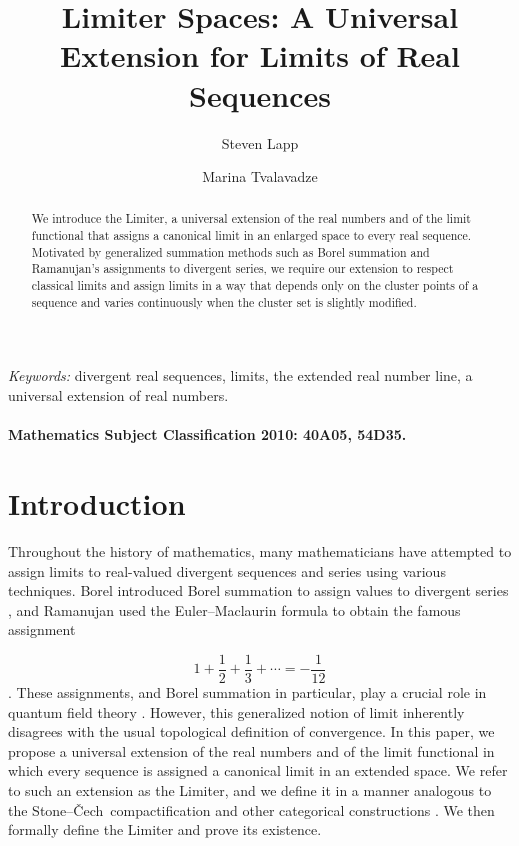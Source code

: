 \documentclass{amsart}
\theoremstyle{definition}
\theoremstyle{plain}
\begin{document}
\title{Limiter Spaces: A Universal Extension for Limits of Real Sequences}
\author{Steven Lapp}
\address{S. Lapp, Department Of Mathematical and
Computational Sciences, University of Toronto Mississauga, 3359
Mississauga Road N., Mississauga, On L5L 1C6}

\author{Marina  Tvalavadze}

\address{M. Tvalavadze, Department Of Mathematical and
Computational Sciences, University of Toronto Mississauga, 3359
Mississauga Road N., Mississauga, On L5L 1C6}

\begin{abstract}
We introduce the Limiter, a universal extension of the real numbers and of the limit functional that assigns a canonical limit in an enlarged space to every real sequence. Motivated by generalized summation methods such as Borel summation and Ramanujan’s assignments to divergent series, we require our extension to respect classical limits and assign limits in a way that depends only on the cluster points of a sequence and varies continuously when the cluster set is slightly modified.    
\end{abstract}
\maketitle
\textit{ Keywords:} divergent real sequences, limits, the extended real number line, a universal extension of real numbers. \\ \ \\
{\small \bf Mathematics Subject Classification 2010: 40A05, 54D35.}



 \section{Introduction}
Throughout the history of mathematics, many mathematicians have attempted to assign limits to real-valued divergent sequences and series using various techniques. Borel introduced Borel summation to assign values to divergent series \cite{Hardy}, and Ramanujan used the Euler–Maclaurin formula to obtain the famous assignment

\[
1 + \frac{1}{2} + \frac{1}{3} + \cdots = -\frac{1}{12}
\]
\cite{Cand}. These assignments, and Borel summation in particular, play a crucial role in quantum field theory \cite{Popov, Zinn}. However, this generalized notion of limit inherently disagrees with the usual topological definition of convergence. In this paper, we propose a universal extension of the real numbers and of the limit functional in which every sequence is assigned a canonical limit in an extended space. We refer to such an extension as the Limiter, and we define it in a manner analogous to the Stone–\v{C}ech\ compactification  and other categorical constructions \cite{Hindman, Ho, Hoehn}. We then formally define the Limiter and prove its existence.
\end{document}
